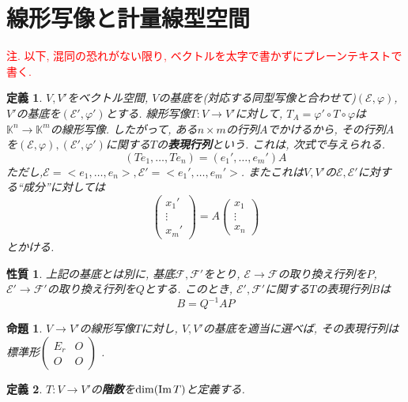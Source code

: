 \documentclass[a4j,dvipdfmx]{jsarticle}
\newcommand{\K}{\mathbb{K}}
\newcommand{\E}{\mathcal{E}}
\newcommand{\F}{\mathcal{F}}
\renewcommand{\Im}{\mathrm{Im}\hspace{0.5mm}}
\theoremstyle{mystyle}
\newtheorem*{definition}{定義}
\newtheorem{proposition}[theorem]{命題}
\newtheorem*{property}{性質}
\begin{document}
\section{線形写像と計量線型空間}
    \textcolor{red}{注. 以下, 混同の恐れがない限り, ベクトルを太字で書かずにプレーンテキストで書く.}
    \begin{definition}
        $V,V'$をベクトル空間, $V$の基底を(対応する同型写像と合わせて)$(\E,\varphi)$, $V'$の基底を$(\E',\varphi')$とする. 線形写像$T:V\to V'$に対して, $T_A=\varphi'\circ T\circ \varphi$は$\K^n\to \K^m$の線形写像. 
        したがって, ある$n\times m$の行列$A$でかけるから, その行列$A$を$(\E,\varphi),(\E',\varphi')$に関する$T$の\textbf{表現行列}という. これは, 次式で与えられる.
        \begin{equation*}
           (Te_1,\dots,Te_n)=(e_1',\dots,e_m')A 
        \end{equation*}
        ただし,$\E=<e_1,\dots,e_n>,\E'=<e_1',\dots,e_m'>$. またこれは$V,V'$の$\E,\E'$に対する``成分''に対しては
        \begin{equation*}
            \begin{pmatrix}
               x_1' \\ \vdots \\ x_m' 
            \end{pmatrix}
            =A\begin{pmatrix}
                x_1 \\ \vdots \\ x_n 
            \end{pmatrix}
        \end{equation*}
        とかける.
    \end{definition}
    \begin{property}
        上記の基底とは別に, 基底$\F,\F'$をとり, $\E\to\F$の取り換え行列を$P$, $\E'\to\F'$の取り換え行列を$Q$とする. このとき, $\E',\F'$に関する$T$の表現行列$B$は
        \begin{equation*}
            B=Q^{-1}AP
        \end{equation*}
    \end{property}
    \begin{proposition}
        $V\to V'$の線形写像$T$に対し, $V,V'$の基底を適当に選べば, その表現行列は標準形$\begin{pmatrix}E_{r} & O \\ O & O\end{pmatrix}$ .
    \end{proposition}
    \begin{definition}
        $T:V\to V'$の\textbf{階数}を$\dim(\Im T)$と定義する.
    \end{definition}
\end{document}
